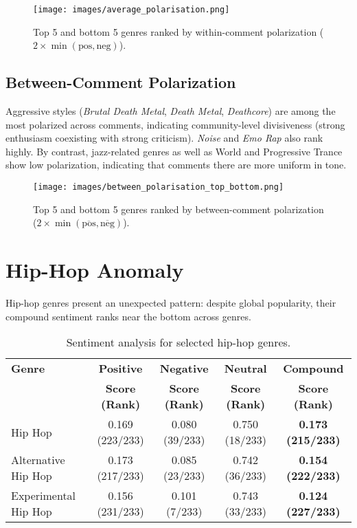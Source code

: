 \begin{figure}[H]
    \centering
    \texttt{[image: images/average\_polarisation.png]}
    \caption{Top 5 and bottom 5 genres ranked by within-comment polarization
    ($2 \times \min(\mathrm{pos}, \mathrm{neg})$).}
    \label{fig:within_polarisation}
\end{figure}
\FloatBarrier

\subsection*{Between-Comment Polarization}
\label{subsubsec:results_between}

Aggressive styles (\textit{Brutal Death Metal}, \textit{Death Metal},
\textit{Deathcore}) are among the most polarized across comments, indicating community-level
divisiveness (strong enthusiasm coexisting with strong criticism). \textit{Noise} and
\textit{Emo Rap} also rank highly. 
By contrast, jazz-related genres as well as World and Progressive Trance show low polarization, indicating that comments there are more uniform in tone.

\begin{figure}[H]
    \centering
    \texttt{[image: images/between\_polarisation\_top\_bottom.png]}
    \caption{Top 5 and bottom 5 genres ranked by between-comment polarization
    ($2 \times \min(\overline{\mathrm{pos}}, \overline{\mathrm{neg}})$).}
    \label{fig:between_polarisation}
\end{figure}
\section{Hip-Hop Anomaly}
\label{subsec:results_hiphop}

Hip-hop genres present an unexpected pattern: despite global popularity, their compound
sentiment ranks near the bottom across genres.

\begin{table}[htbp]
\centering
\caption{Sentiment analysis for selected hip-hop genres.}
\label{tab:hiphop_sentiment}
\begin{tabular}{|l|c|c|c|c|}
\hline
\textbf{Genre} & \textbf{Positive} & \textbf{Negative} & \textbf{Neutral} & \textbf{Compound} \\
 & \textbf{Score (Rank)} & \textbf{Score (Rank)} & \textbf{Score (Rank)} & \textbf{Score (Rank)} \\
\hline
Hip Hop & 0.169 (223/233) & 0.080 (39/233) & 0.750 (18/233) & \textbf{0.173 (215/233)} \\
\hline
Alternative Hip Hop & 0.173 (217/233) & 0.085 (23/233) & 0.742 (36/233) & \textbf{0.154 (222/233)} \\
\hline
Experimental Hip Hop & 0.156 (231/233) & 0.101 (7/233) & 0.743 (33/233) & \textbf{0.124 (227/233)} \\
\hline
\end{tabular}
\end{table}

